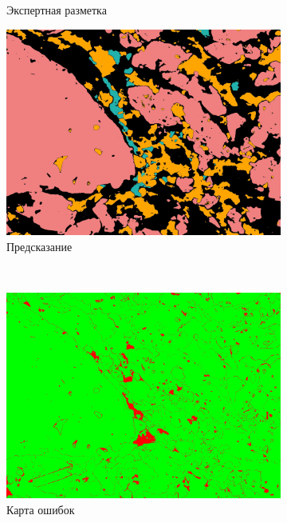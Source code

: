 \begin{figure}[H]
\begin{subfigure}{.33\textwidth}
  \caption{Экспертная разметка}
  \label{fig:sfig2_2}
\end{subfigure}%
\begin{subfigure}{.33\textwidth}
  \centering
  \includegraphics[width=.9\linewidth]{pics/image_7_pred.jpg}
  \caption{Предсказание}
  \label{fig:sfig2_3}
\end{subfigure} \\
\centering
\begin{subfigure}{.33\textwidth}
  \centering
  \includegraphics[width=.9\linewidth]{pics/image_7_error.jpg}
  \caption{Карта ошибок}
  \label{fig:sfig2_4}
\end{subfigure}%
\begin{subfigure}{.33\textwidth}
  \centering

\end{subfigure}
\end{figure}
